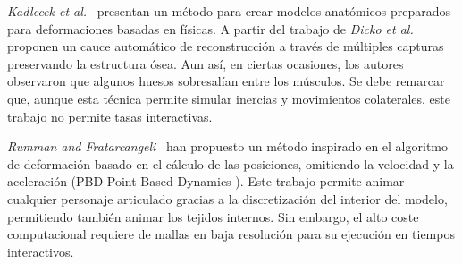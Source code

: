 \emph{Kadlecek et al.}~\cite{kadlecek-16-reconstructing} presentan un método para crear modelos anatómicos preparados para deformaciones basadas en físicas. A partir del trabajo de \emph{Dicko et al.}\cite{Ali2013} proponen un cauce automático de reconstrucción a través de múltiples capturas preservando la estructura ósea. Aun así, en ciertas ocasiones, los autores observaron que algunos huesos sobresalían entre los músculos. Se debe remarcar que, aunque esta técnica permite simular inercias y movimientos colaterales, este trabajo no permite tasas interactivas.   %

\emph{Rumman and Fratarcangeli}~\cite{abu2015position} han propuesto un método inspirado en el algoritmo de deformación basado en el cálculo de las posiciones, omitiendo la velocidad y la aceleración (PBD Point-Based Dynamics \cite{Bender:2014}). Este trabajo permite animar cualquier personaje articulado gracias a la discretización del interior del modelo, permitiendo también animar los tejidos internos. Sin embargo, el alto coste computacional requiere de mallas en baja resolución para su ejecución en tiempos interactivos.

